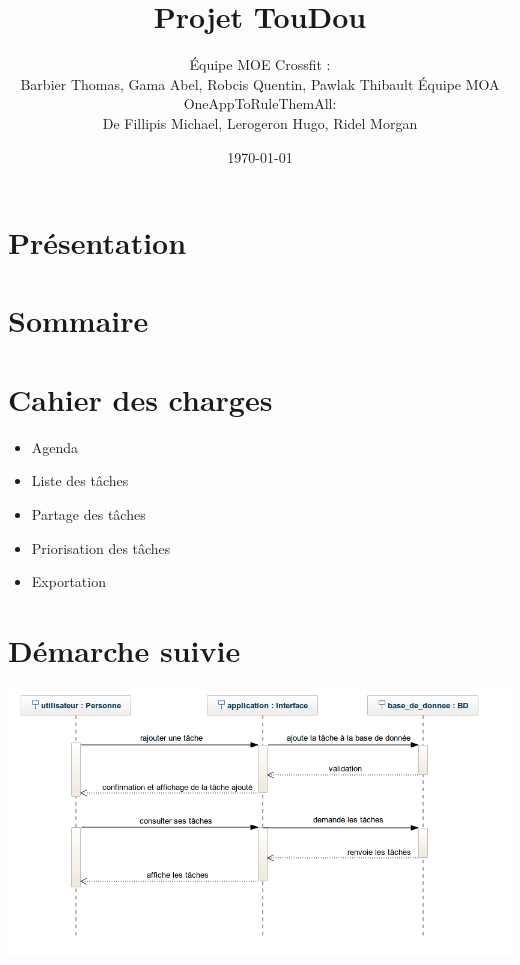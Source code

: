 \documentclass[french]{beamer}
\title{Projet TouDou}
\author{Équipe MOE Crossfit : \\Barbier Thomas, Gama Abel, Robcis Quentin, Pawlak Thibault
\vspace{0.5cm}
Équipe MOA OneAppToRuleThemAll: \\De Fillipis Michael, Lerogeron Hugo, Ridel Morgan }
\institute[]{INSA de Rouen}
\date{\today}
\begin{document}
\section{Présentation}
\begin{frame}
\titlepage
\end{frame}

\section{Sommaire}
\begin{frame}
\tableofcontents
\end{frame}

\section{Cahier des charges}
\begin{frame}
\begin{itemize}
  \item Agenda
  \item Liste des tâches
  \item Partage des tâches
  \item Priorisation des tâches
  \item Exportation
\end{itemize}
\end{frame}

\section{Démarche suivie}
\begin{frame}
  \begin{center}
  \begin{minipage}[c]{0.6\linewidth}%
   \includegraphics[width=1\linewidth]{dss}  %
  \end{minipage}
\end{center}
\end{frame}
\end{document}
